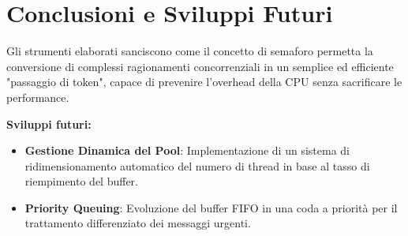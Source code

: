 \documentclass[a4paper,12pt]{article}
\begin{document}
\section{Conclusioni e Sviluppi Futuri}
Gli strumenti elaborati sanciscono come il concetto di semaforo permetta la conversione di complessi ragionamenti concorrenziali in un semplice ed efficiente "passaggio di token", capace di prevenire l'overhead della CPU senza sacrificare le performance.

\noindent \textbf{Sviluppi futuri:}
\begin{itemize}
    \item \textbf{Gestione Dinamica del Pool}: Implementazione di un sistema di ridimensionamento automatico del numero di thread in base al tasso di riempimento del buffer.
    \item \textbf{Priority Queuing}: Evoluzione del buffer FIFO in una coda a priorità per il trattamento differenziato dei messaggi urgenti.
\end{itemize}
\end{document}
